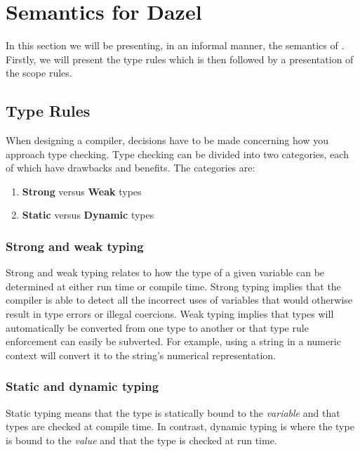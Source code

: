\section{Semantics for Dazel} \label{sec:semantics}

In this section we will be presenting, in an informal manner, the semantics of \dazel{}.
Firstly, we will present the type rules which is then followed by a presentation of the scope rules.

\subsection{Type Rules}

When designing a compiler, decisions have to be made concerning how you approach type checking.
Type checking can be divided into two categories, each of which have drawbacks and benefits. The categories are:

\begin{enumerate}
    \item \textbf{Strong} versus \textbf{Weak} types
    \item \textbf{Static} versus \textbf{Dynamic} types
\end{enumerate}

\subsubsection*{Strong and weak typing}
Strong and weak typing relates to how the type of a given variable can be determined at either run time or compile time.
Strong typing implies that the compiler is able to detect all the incorrect uses of variables that would otherwise result in type errors or illegal coercions.
Weak typing implies that types will automatically be converted from one type to another or that type rule enforcement can easily be subverted.
For example, using a string in a numeric context will convert it to the string's numerical representation\cite{sebesta_concepts_2016}.

\subsubsection*{Static and dynamic typing}
Static typing means that the type is statically bound to the \emph{variable} and that types are checked at compile time.
In contrast, dynamic typing is where the type is bound to the \emph{value} and that the type is checked at run time\cite{sebesta_concepts_2016}.\\

